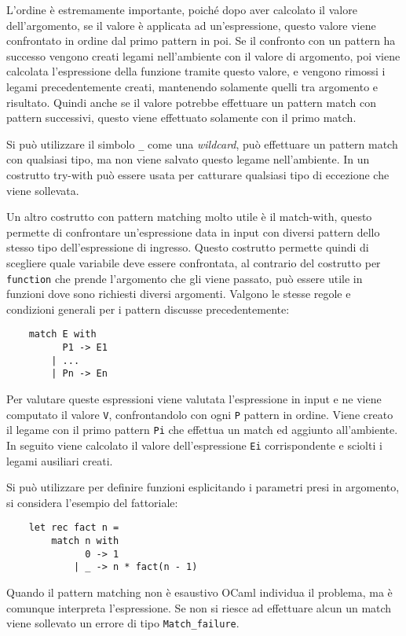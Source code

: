 \documentclass{article}
\numberwithin{equation}{subsection}
\begin{document}
L'ordine è estremamente importante, poiché dopo aver calcolato il valore dell'argomento, se il valore è applicata ad un'espressione, questo valore viene confrontato in ordine dal primo pattern in poi. Se il confronto con un pattern ha successo vengono creati legami nell'ambiente con il valore di argomento, poi viene calcolata l'espressione della funzione tramite questo valore, e vengono rimossi i legami precedentemente creati, mantenendo solamente quelli tra argomento e risultato. Quindi anche se il valore potrebbe effettuare un pattern match con pattern successivi, questo viene effettuato solamente con il primo match. 

Si può utilizzare il simbolo \verb|_| come una \textit{wildcard}, può effettuare un pattern match con qualsiasi tipo, ma non viene salvato questo legame nell'ambiente. In un costrutto try-with può essere usata per catturare qualsiasi tipo di eccezione che viene sollevata. 

Un altro costrutto con pattern matching molto utile è il match-with, questo permette di confrontare un'espressione data in input con diversi pattern dello stesso tipo dell'espressione di ingresso. Questo costrutto permette quindi di scegliere quale variabile deve essere confrontata, al contrario del costrutto per \verb|function| che prende l'argomento che gli viene passato, può essere utile in funzioni dove sono richiesti diversi argomenti. Valgono le stesse regole e condizioni generali per i pattern discusse precedentemente:
\begin{verbatim}
    match E with
          P1 -> E1
        | ...
        | Pn -> En
\end{verbatim}
Per valutare queste espressioni viene valutata l'espressione in input e ne viene computato il valore \verb|V|, confrontandolo con ogni \verb|P| pattern in ordine. Viene creato il legame con il primo pattern \verb|Pi| che effettua un match ed aggiunto all'ambiente. In seguito viene calcolato il valore dell'espressione \verb|Ei| corrispondente e sciolti i legami ausiliari creati. 


Si può utilizzare per definire funzioni esplicitando i parametri presi in argomento, si considera l'esempio del fattoriale:
\begin{verbatim}
    let rec fact n =
        match n with
              0 -> 1
            | _ -> n * fact(n - 1)
\end{verbatim}
Quando il pattern matching non è esaustivo OCaml individua il problema, ma è comunque interpreta l'espressione. Se non si riesce ad effettuare alcun un match viene sollevato un errore di tipo \verb|Match_failure|. 
\end{document}
